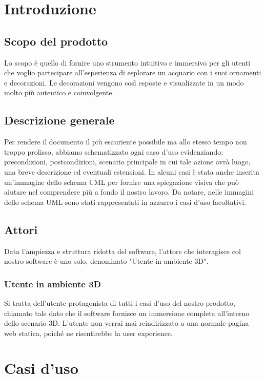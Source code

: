 \section{Introduzione}
\subsection{Scopo del prodotto}
Lo scopo è quello di fornire uno strumento intuitivo e immersivo per gli utenti che voglio partecipare all'esperienza di esplorare un acquario con i suoi ornamenti e decorazioni.
\newline
Le decorazioni vengono così esposte e visualizzate in un modo molto più autentico e coinvolgente.

\subsection{Descrizione generale}
Per rendere il documento il più esauriente possibile ma allo stesso tempo non troppo prolisso, abbiamo schematizzato ogni caso d'uso evidenziando:  precondizioni, postcondizioni, scenario principale in cui tale azione avrà luogo, una breve descrizione ed eventuali estensioni.\newline
In alcuni casi è stata anche inserita un'immagine dello schema UML per fornire una spiegazione visiva che può aiutare nel comprendere più a fondo il nostro lavoro.\newline
Da notare, nelle immagini dello schema UML sono stati rappresentati in azzurro i casi d'uso facoltativi.

\subsection{Attori}
Data l'ampiezza e struttura ridotta del software, l'attore che interagisce col nostro software è uno solo, denominato "Utente in ambiente 3D". 

\subsubsection{Utente in ambiente 3D}
Si tratta dell'utente protagonista di tutti i casi d'uso del nostro prodotto, chiamato tale dato che il software fornisce un immersione completa all'interno dello scenario 3D. \newline
L'utente non verrai mai reindirizzato a una normale pagina web statica, poiché ne risentirebbe la user experience. 

\section{Casi d'uso}

